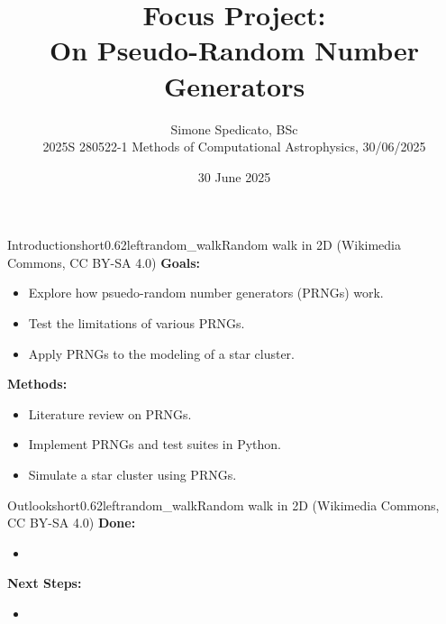 \documentclass[hyperref={pdfpagelabels=false}, aspectratio=169, t]{beamer}  %
\title{Focus Project: \\ On Pseudo-Random Number Generators}											%
\subtitle{Simone Spedicato, BSc \\ 2025S 280522-1 Methods of Computational Astrophysics, 30/06/2025}                   					%
\date{30 June 2025}              									%
\begin{document}

\maketitle
											
													





\begin{graphicsFrame}{Introduction}{short}{0.62}{left}{random_walk}{Random walk in 2D (Wikimedia Commons, CC BY-SA 4.0)}
	\textbf{Goals:}
	\begin{itemize}
		\item Explore how psuedo-random number generators (PRNGs) work.
		\item Test the limitations of various PRNGs. 
		\item Apply PRNGs to the modeling of a star cluster.
	\end{itemize}
	\vspace{0.8em}
	\textbf{Methods:}
	\begin{itemize}
		\item Literature review on PRNGs.
		\item Implement PRNGs and test suites in Python.
		\item Simulate a star cluster using PRNGs.
	\end{itemize}
\end{graphicsFrame}

\begin{graphicsFrame}{Outlook}{short}{0.62}{left}{random_walk}{Random walk in 2D (Wikimedia Commons, CC BY-SA 4.0)}
	\textbf{Done:}
	\begin{itemize}
		\item 
	\end{itemize}
	\vspace{0.8em}
	\textbf{Next Steps:}
	\begin{itemize}
		\item 
	\end{itemize}
\end{graphicsFrame}
\end{document}
